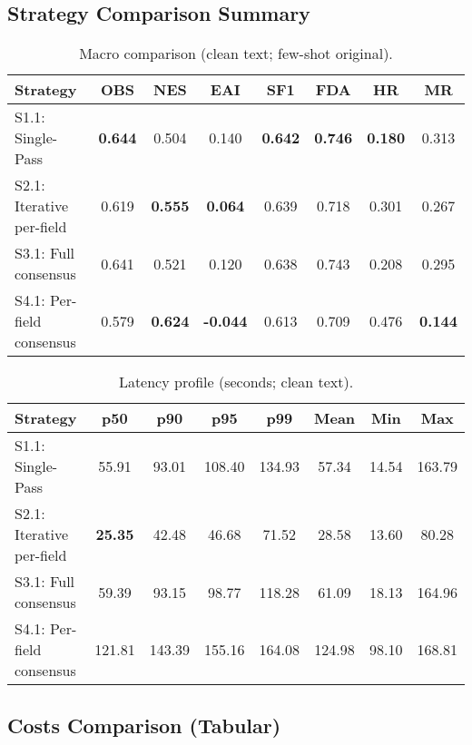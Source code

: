 \subsection{Strategy Comparison Summary}
\label{appendix:comparison}

\begin{table}[H]
 \centering
\caption{Macro comparison (clean text; few-shot original).}
\label{tab:strategy-comparison}
\begin{tabular}{lccccccc}
\toprule
 Strategy & OBS & NES & EAI & SF1 & FDA & HR & MR \\
\midrule
 S1.1: Single-Pass & \textbf{0.644} & 0.504 & 0.140 & \textbf{0.642} & \textbf{0.746} & \textbf{0.180} & 0.313 \\
 S2.1: Iterative per-field & 0.619 & \textbf{0.555} & \textbf{0.064} & 0.639 & 0.718 & 0.301 & 0.267 \\
 S3.1: Full consensus & 0.641 & 0.521 & 0.120 & 0.638 & 0.743 & 0.208 & 0.295 \\
 S4.1: Per-field consensus & 0.579 & \textbf{0.624} & \textbf{-0.044} & 0.613 & 0.709 & 0.476 & \textbf{0.144} \\
\bottomrule
\end{tabular}
\end{table}

\begin{table}[H]
 \centering
\caption{Latency profile (seconds; clean text).}
\label{tab:latency-comparison}
\begin{tabular}{lccccccc}
\toprule
 Strategy & p50 & p90 & p95 & p99 & Mean & Min & Max \\
\midrule
 S1.1: Single-Pass & 55.91 & 93.01 & 108.40 & 134.93 & 57.34 & 14.54 & 163.79 \\
 S2.1: Iterative per-field & \textbf{25.35} & 42.48 & 46.68 & 71.52 & 28.58 & 13.60 & 80.28 \\
 S3.1: Full consensus & 59.39 & 93.15 & 98.77 & 118.28 & 61.09 & 18.13 & 164.96 \\
 S4.1: Per-field consensus & 121.81 & 143.39 & 155.16 & 164.08 & 124.98 & 98.10 & 168.81 \\
\bottomrule
\end{tabular}
\end{table}

\subsection*{Costs Comparison (Tabular)}

